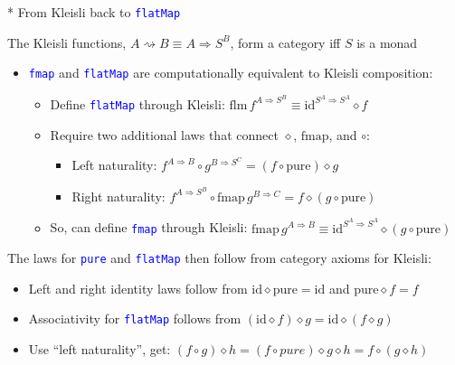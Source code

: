 \documentclass[english]{beamer}
\begin{document}
\begin{frame}{{*} From Kleisli back to \texttt{\textcolor{blue}{\footnotesize{}flatMap}} }

The Kleisli functions, $A\rightsquigarrow B\equiv A\Rightarrow S^{B}$,
form a category iff $S$ is a monad 
\begin{itemize}
\item \texttt{\textcolor{blue}{\footnotesize{}fmap}} and \texttt{\textcolor{blue}{\footnotesize{}flatMap}}
are computationally equivalent to Kleisli composition:
\begin{itemize}
\item Define \texttt{\textcolor{blue}{\footnotesize{}flatMap}} through Kleisli:{\small{}
$\text{flm}\,f^{A\Rightarrow S^{B}}\equiv\text{id}^{S^{A}\Rightarrow S^{A}}\diamond f$}{\small\par}
\item Require two additional laws that connect $\diamond$, $\text{fmap}$,
and $\circ$:
\begin{itemize}
\item Left naturality: {\small{}$f^{A\Rightarrow B}\circ g^{B\Rightarrow S^{C}}=\left(f\circ\text{pure}\right)\diamond g$}{\small\par}
\item Right naturality: {\small{}$f^{A\Rightarrow S^{B}}\circ\text{fmap}\,g^{B\Rightarrow C}=f\diamond\left(g\circ\text{pure}\right)$}{\small\par}
\end{itemize}
\item So, can define \texttt{\textcolor{blue}{\footnotesize{}fmap}} through
Kleisli: $\text{fmap}\,g^{A\Rightarrow B}\equiv\text{id}^{S^{A}\Rightarrow S^{A}}\diamond\left(g\circ\text{pure}\right)$
\end{itemize}
\end{itemize}
The laws for \texttt{\textcolor{blue}{\footnotesize{}pure}} and \texttt{\textcolor{blue}{\footnotesize{}flatMap}}
then follow from category axioms for Kleisli:
\begin{itemize}
\item Left and right identity laws follow from $\text{id}\diamond\text{pure}=\text{id}$
and $\text{pure}\diamond f=f$ 
\item Associativity for \texttt{\textcolor{blue}{\footnotesize{}flatMap}}
follows from $\left(\text{id}\diamond f\right)\diamond g=\text{id}\diamond\left(f\diamond g\right)$
\item Use ``left naturality'', get: $\left(f\circ g\right)\diamond h=\left(f\circ pure\right)\diamond g\diamond h=f\circ\left(g\diamond h\right)$

\end{itemize}
\end{frame}
\end{document}
